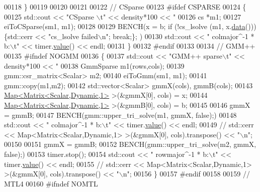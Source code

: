 \begin{DoxyCode}
{{00118     \}
00119 
00120 
00121 
00122     \textcolor{comment}{// CSparse}
00123 \textcolor{preprocessor}{    #ifdef CSPARSE}
00124     \{
00125       std::cout << \textcolor{stringliteral}{"CSparse \(\backslash\)t"} << density*100 << \textcolor{stringliteral}{"%
00126       cs *m1;
00127       eiToCSparse(sm1, m1);
00128 
00129       BENCH(x = b; \textcolor{keywordflow}{if} (!cs\_lsolve (m1, x.\hyperlink{class_eigen_1_1_plain_object_base_ac25699535374b1854cf8494e44ad31b2}{data}()))\{std::cerr << \textcolor{stringliteral}{"cs\_lsolve failed\(\backslash\)n"}; \textcolor{keywordflow}{break};\}; )
00130       std::cout << \textcolor{stringliteral}{"   colmajor^-1 * b:\(\backslash\)t"} << timer.\hyperlink{class_eigen_1_1_bench_timer_a26760f963ed8b64c126159bfea57735e}{value}() << endl;
00131     \}
00132 \textcolor{preprocessor}{    #endif}
00133 
00134     \textcolor{comment}{// GMM++}
00135 \textcolor{preprocessor}{    #ifndef NOGMM}
00136     \{
00137       std::cout << \textcolor{stringliteral}{"GMM++ sparse\(\backslash\)t"} << density*100 << \textcolor{stringliteral}{"%
00138       GmmSparse m1(rows,cols);
00139       gmm::csr\_matrix<Scalar> m2;
00140       eiToGmm(sm1, m1);
00141       gmm::copy(m1,m2);
00142       std::vector<Scalar> gmmX(cols), gmmB(cols);
00143       \hyperlink{group___core___module_class_eigen_1_1_map}{Map<Matrix<Scalar,Dynamic,1>} >(&gmmX[0], cols) = x;
00144       \hyperlink{group___core___module_class_eigen_1_1_map}{Map<Matrix<Scalar,Dynamic,1>} >(&gmmB[0], cols) = b;
00145 
00146       gmmX = gmmB;
00147       BENCH(gmm::upper\_tri\_solve(m1, gmmX, \textcolor{keyword}{false});)
00148       std::cout << \textcolor{stringliteral}{"   colmajor^-1 * b:\(\backslash\)t"} << timer.\hyperlink{class_eigen_1_1_bench_timer_a26760f963ed8b64c126159bfea57735e}{value}() << endl;
00149 \textcolor{comment}{//       std::cerr << Map<Matrix<Scalar,Dynamic,1> >(&gmmX[0], cols).transpose() << "\(\backslash\)n";}
00150 
00151       gmmX = gmmB;
00152       BENCH(gmm::upper\_tri\_solve(m2, gmmX, \textcolor{keyword}{false});)
00153       timer.stop();
00154       std::cout << \textcolor{stringliteral}{"   rowmajor^-1 * b:\(\backslash\)t"} << timer.\hyperlink{class_eigen_1_1_bench_timer_a26760f963ed8b64c126159bfea57735e}{value}() << endl;
00155 \textcolor{comment}{//       std::cerr << Map<Matrix<Scalar,Dynamic,1> >(&gmmX[0], cols).transpose() << "\(\backslash\)n";}
00156     \}
00157 \textcolor{preprocessor}{    #endif}
00158 
00159     \textcolor{comment}{// MTL4}
00160 \textcolor{preprocessor}{    #ifndef NOMTL}
}}}}
\end{DoxyCode}
